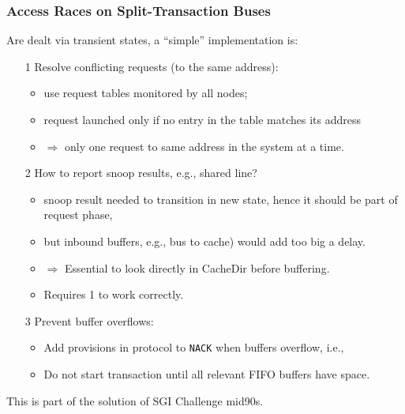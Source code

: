 \documentclass{beamer}
\renewcommand{\emph}[1]{\textcolor{structure}{#1}}
\newcommand{\emp}[1]{\textcolor{DikuRed}{ #1}}
\begin{document}
\begin{frame}[fragile,t]
\frametitle{Access Races on Split-Transaction Buses}

Are dealt via transient states, a ``simple'' implementation is: %
\begin{itemize}
    \item[1] \emp{Resolve conflicting requests (to the same address):}\\
            \begin{itemize} 
                \item use request tables monitored by all nodes;
                \item request launched only if no entry in the table matches its address 
                \item $\Rightarrow$ only one request to same address in the system at a time.
            \end{itemize} 
    \item[2] \emp{How to report snoop results, e.g., shared line?}
            \begin{itemize} 
                \item snoop result needed to transition in new state, 
                        hence it should be part of request phase,
                \item but inbound buffers, e.g., bus to cache) would add too big a delay. 
                \item $\Rightarrow$ Essential to look directly in CacheDir before buffering.
                \item Requires \emph{1} to work correctly.
            \end{itemize} 
    \item[3] \emp{Prevent buffer overflows:}
            \begin{itemize} 
                \item Add provisions in protocol to {\tt NACK} when buffers overflow, i.e.,
                \item Do not start transaction until all relevant FIFO buffers have space. 
            \end{itemize}             
\end{itemize}

This is part of the solution of SGI Challenge mid90s.

\end{frame}
\end{document}
